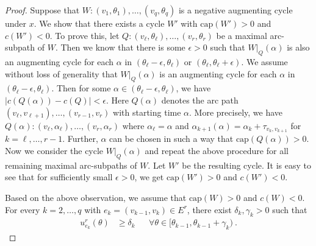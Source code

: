 \documentclass{svjour3}                     \smartqed
\newcommand{\ca}{\ensuremath{\text{cap}}}
\begin{document}
\begin{proof}
Suppose that $W:(v_1,\theta_1),\ldots,(v_q,\theta_q)$ is a negative augmenting cycle under $x$.
We show that there exists a cycle $W'$ with $\ca(W')>0$ and \mbox{$c(W')<0$}.
To prove this, let $Q:(v_\ell,\theta_\ell),\ldots,(v_r,\theta_r)$ be a maximal arc-subpath of $W$. Then we know that there is some $\epsilon>0$ such that $W|_Q(\alpha)$ is also an augmenting cycle for each $\alpha$ in $(\theta_\ell-\epsilon,\theta_\ell)$ or $(\theta_\ell,\theta_\ell+\epsilon)$. We assume without loss of generality that $W|_Q(\alpha)$ is an augmenting cycle for each $\alpha$ in $(\theta_\ell-\epsilon,\theta_\ell)$. Then for some $\alpha\in (\theta_\ell-\epsilon,\theta_\ell)$, we have $|c(Q(\alpha))-c(Q)|<\epsilon$. Here $Q(\alpha)$ denotes the arc path $(v_\ell,v_{\ell+1}),\ldots, (v_{r-1},v_r)$ with starting time $\alpha$. More precisely, we have $Q(\alpha):(v_\ell,\alpha_\ell),\ldots,(v_r,\alpha_r)$ where $\alpha_\ell=\alpha$ and $\alpha_{k+1}(\alpha)=\alpha_{k}+\tau_{v_{k},v_{k+1}}$ for $k=\ell,\ldots,r-1$. Further, $\alpha$ can be chosen in such a way that $\ca(Q(\alpha))>0$. Now we consider the cycle $W|_Q(\alpha)$ and repeat the above procedure for all remaining maximal arc-subpaths of $W$. Let $W'$ be the resulting cycle. It is easy to see that for sufficiently small $\epsilon>0$, we get $\ca(W')>0$ and $c(W')<0$.

Based on the above observation, we assume that $\ca(W)>0$ and \mbox{$c(W)<0$}. For every
$k=2,\ldots,q$ with $e_k=(v_{k-1}, v_k)\in E^r$, there exist $\delta_k, \gamma_k>0$
such that
\begin{align*}
u^r_{e_k}(\theta)&\geq \delta_k && \forall\theta\in [\theta_{k-1},\theta_{k-1}+\gamma_k)~.
\end{align*}


\end{proof}
\end{document}
